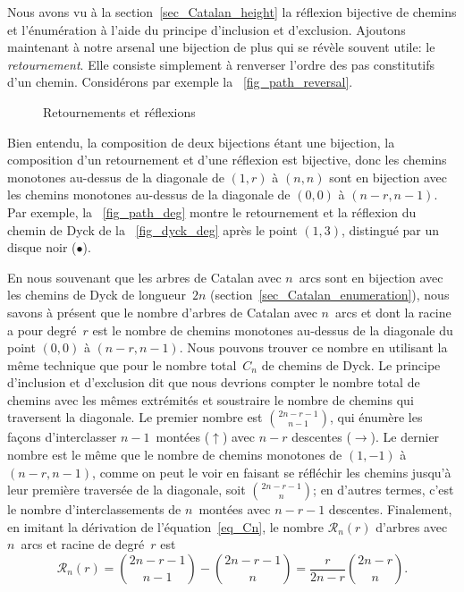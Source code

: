Nous avons vu à la section~\vref{sec_Catalan_height} la réflexion
bijective de chemins et l'énumération à l'aide du principe d'inclusion
et d'exclusion. Ajoutons maintenant à notre arsenal une bijection de
plus qui se révèle souvent utile: le \emph{retournement}. Elle
consiste simplement à renverser l'ordre des pas constitutifs d'un
chemin. Considérons par exemple la \fig~\ref{fig_path_reversal}.
\begin{figure}
\centering
{}
\qquad
{}
\caption{Retournements et réflexions}
\end{figure}
Bien entendu, la composition de deux bijections étant une bijection,
la composition d'un retournement et d'une réflexion est bijective,
donc les chemins monotones au-dessus de la diagonale de \((1,r)\) à
\((n,n)\) sont en bijection avec les chemins monotones au-dessus de la
diagonale de \((0,0)\) à \((n-r,n-1)\). Par exemple, la
\fig~\ref{fig_path_deg} montre le retournement et la réflexion du
chemin de Dyck de la \fig~\ref{fig_dyck_deg} après le point \((1,3)\),
distingué par un disque noir (\(\bullet\)).

En nous souvenant que les arbres de Catalan avec \(n\)~arcs sont en
bijection avec les chemins de Dyck de longueur~\(2n\)
(section~\vref{sec_Catalan_enumeration}), nous savons à présent que le
nombre d'arbres de Catalan avec \(n\)~arcs et dont la racine a pour
degré~\(r\) est le nombre de chemins monotones au-dessus de la
diagonale du point \((0,0)\) à \((n-r,n-1)\). Nous pouvons trouver ce
nombre en utilisant la même technique que pour le nombre total~\(C_n\)
de chemins de Dyck. Le principe d'inclusion et d'exclusion dit que
nous devrions compter le nombre total de chemins avec les mêmes
extrémités et soustraire le nombre de chemins qui traversent la
diagonale. Le premier nombre est \(\binom{2n-r-1}{n-1}\), qui énumère
les façons d'interclasser \(n-1\)~montées (\(\uparrow\)) avec \(n-r\)
descentes (\(\rightarrow\)). Le dernier nombre est le même que le
nombre de chemins monotones de \((1,-1)\) à \((n-r,n-1)\), comme on
peut le voir en faisant se réfléchir les chemins jusqu'à leur première
traversée de la diagonale, soit \(\binom{2n-r-1}{n}\); en d'autres
termes, c'est le nombre d'interclassements de \(n\)~montées avec
\(n-r-1\) descentes. Finalement, en imitant la dérivation de
l'équation~\eqref{eq_Cn}, le nombre \(\mathcal{R}_n(r)\) d'arbres avec
\(n\)~arcs et racine de degré~\(r\) est
\begin{equation*}
\mathcal{R}_n(r) = \binom{2n-r-1}{n-1} - \binom{2n-r-1}{n} 
                 = \frac{r}{2n-r} \binom{2n-r}{n}.
\end{equation*}

